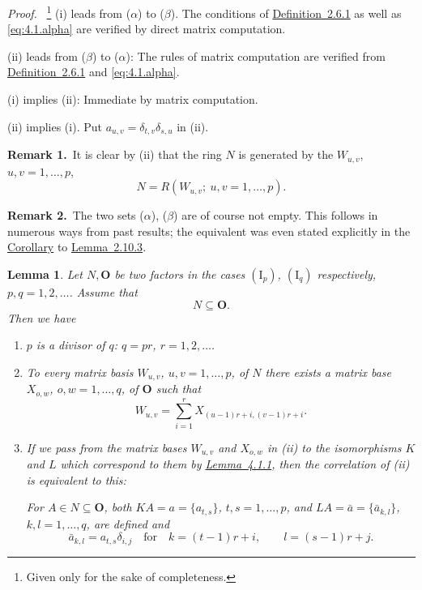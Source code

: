 \documentclass[b5paper,twoside]{article}
\newcommand{\lemref}[2]{\hyperref[#1]{\mbox{Lemma~#2}}}
\newcommand{\defref}[2]{\hyperref[#1]{\mbox{Definition~#2}}}
\theoremstyle{mvnplain}
\newtheorem{lemma}{Lemma}[section]
\renewenvironment{proof}[1][Proof]{%
  \par\addvspace{0.35\baselineskip}%
  \noindent\textit{#1.}\ \normalfont\ignorespaces
}{%
  \par\addvspace{0.35\baselineskip}%
}
\newcommand{\N}{\mathbf N}
\newcommand{\R}{\mathbf R}
\def\N{N}%
\def\R{R}%
\def\mathfrak#1{#1}%
\begin{document}
\begin{proof}\footnote{Given only for the sake of completeness.}
(i) leads from (\(\alpha\)) to (\(\beta\)). The conditions of
\defref{def:2.6.1}{2.6.1} as well as \eqref{eq:4.1.alpha} are verified by
direct matrix computation.

(ii) leads from (\(\beta\)) to (\(\alpha\)): The rules of matrix computation
are verified from \defref{def:2.6.1}{2.6.1} and \eqref{eq:4.1.alpha}.

(i) implies (ii): Immediate by matrix computation.

(ii) implies (i). Put \(a_{u,v}=\delta_{t,v}\delta_{s,u}\) in (ii).
\end{proof}

\par{}
\noindent\textbf{Remark 1.}\ 
It is clear by (ii) that the ring \(\N\) is generated by the \(W_{u,v}\),
\(u,v=1,\ldots,p\),
\[
  \N=\R(W_{u,v};\ u,v=1,\ldots,p).
\]

\noindent\textbf{Remark 2.}\ 
The two sets (\(\alpha\)), (\(\beta\)) are of course not empty. This follows
in numerous ways from past results; the equivalent was even stated explicitly
in the \hyperref[cor:2.10.3]{Corollary} to
\lemref{lem:2.10.3}{2.10.3}.

\begin{lemma}\label{lem:4.1.2}
Let \(\N,\mathbf O\) be two factors in the cases \((\mathrm I_p)\),
\((\mathrm I_q)\) respectively, \(p,q=1,2,\ldots\). Assume that
\[
  \N\subseteq\mathbf O.
\]
Then we have
\begin{enumerate}[label=\((\roman*)\)]
\item \(p\) is a divisor of \(q\): \(q=pr\), \(r=1,2,\ldots\).
\item To every matrix basis \(W_{u,v}\), \(u,v=1,\ldots,p\), of \(\N\)
there exists a matrix base \(X_{o,w}\), \(o,w=1,\ldots,q\), of \(\mathbf O\)
such that
\[
  W_{u,v}=\sum_{i=1}^{r}X_{(u-1)r+i,(v-1)r+i}.
\]
\item If we pass from the matrix bases \(W_{u,v}\) and \(X_{o,w}\) in (ii)
to the isomorphisms \(\mathfrak K\) and \(\mathfrak L\) which correspond to
them by \lemref{lem:4.1.1}{4.1.1}, then the correlation of (ii) is equivalent
to this:

For \(A\in\N\subseteq\mathbf O\), both
\(\mathfrak K A=a=\{a_{t,s}\}\), \(t,s=1,\ldots,p\), and
\(\mathfrak L A=\bar a=\{\bar a_{k,l}\}\), \(k,l=1,\ldots,q\), are
defined and
\[
  \bar a_{k,l}=a_{t,s}\delta_{i,j}
  \quad\text{for}\quad
  k=(t-1)r+i,\qquad l=(s-1)r+j.
\]
\end{enumerate}
\end{lemma}
\end{document}
